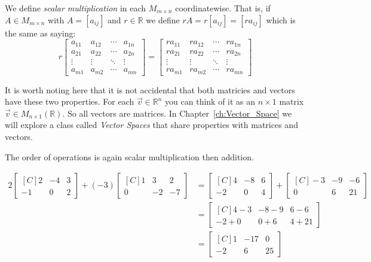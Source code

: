 \begin{definition} We define \emph{scalar multiplication} in each $M_{m\times n}$ coordinatewise. That is, if 
$A \in M_{m \times n}$ with $A=[a_{ij}]$ and $r \in \mathbb{R}$ we define 
$rA=r[a_{ij}]=[ra_{ij}]$ which is the same as saying:
\[
r\begin{bmatrix}
a_{11} & a_{12} & \cdots & a_{1n} \\
a_{21} & a_{22} & \cdots & a_{2n} \\
\vdots & \vdots & \ddots & \vdots \\
a_{m1} & a_{m2} & \cdots & a_{mn}
\end{bmatrix}
=
\begin{bmatrix}
ra_{11} & ra_{12} & \cdots & ra_{1n} \\
ra_{21} & ra_{22} & \cdots & ra_{2n} \\
\vdots  & \vdots  & \ddots & \vdots \\
ra_{m1} & ra_{m2} & \cdots & ra_{mn}
\end{bmatrix}
\]
\end{definition}

\begin{remark}
It is worth noting here that it is not accidental that both matricies and 
vectors have these two properties. For each $\vec{v} \in \mathbb{R}^n$ you can
think of it as an $n\times 1$ matrix $\vec{v} \in M_{n\times 1}(\mathbb{R})$. 
So all vectors are matrices. In Chapter~\ref{ch:Vector_Space} we will explore
a class called \emph{Vector Spaces} that share properties with matrices and 
vectors.
\end{remark}

The order of operations is again scalar multiplication then addition.

\begin{example}
\begin{align*}
2\begin{bmatrix*}[C]
2  & -4 & 3 \\
-1 & 0  & 2
\end{bmatrix*}+
(-3)\begin{bmatrix*}[C]
1  & 3 & 2 \\
0 & -2  & -7
\end{bmatrix*}
&=
\begin{bmatrix*}[C]
4  & -8 & 6 \\
-2 & 0  & 4
\end{bmatrix*}+
\begin{bmatrix*}[C]
-3 & -9  & -6 \\
0  & 6 & 21
\end{bmatrix*}\\
&=\begin{bmatrix*}[C]
4-3  & -8-9 & 6-6 \\
-2+0 & 0+6  & 4+21
\end{bmatrix*}\\
&=\begin{bmatrix*}[C]
1  & -17 & 0 \\
-2 & 6  & 25
\end{bmatrix*}
\end{align*}
\end{example}


